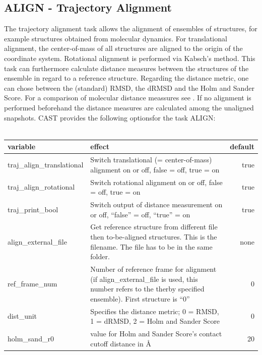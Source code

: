 \documentclass[10pt,a4paper]{article} %
\begin{document}
	\subsection{ALIGN - Trajectory Alignment}
	\label{sec:align}
	The trajectory alignment task allows the alignment of ensembles of structures, for example structures obtained from molecular dynamics. For translational alignment, the center-of-mass of all structures are aligned to the origin of the coordinate system. Rotational alignment is performed via Kabsch's method\supercite{kabsch1, kabsch2}. This task can furthermore calculate distance measures between the structures of the ensemble in regard to a reference structure. Regarding the distance metric, one can chose between the (standard) \ac{RMSD}, the \ac{dRMSD} and the Holm and Sander Score\supercite{holmsander}. For a comparison of molecular distance meassures see \cite{distancemeasures}. If no alignment is performed beforehand the distance measures are calculated among the unaligned snapshots. \ac{CAST} provides the following optionsfor the task ALIGN: \\~\\
	
	\begin{tabularx}{\textwidth}{l|X|r}
		variable & effect & default\\
		\hline
		traj\_align\_translational & Switch translational (= center-of-mass) alignment on or off, false = off, true = on & true\\
		traj\_align\_rotational & Switch rotational alignment\cite{kabsch1, kabsch2} on or off, false = off, true = on & true\\
		traj\_print\_bool & Switch output of distance measurement on or off, ``false'' = off, ``true'' = on & true\\
		align\_external\_file & Get reference structure from different file then to-be-aligned structures. This is the filename. The file has to be in the same folder. & none\\
		ref\_frame\_num & Number of reference frame for alignment (if align\_external\_file is used, this number refers to the therby specified ensemble). First structure is ``0'' & 0\\
		dist\_unit & Specifies the distance metric; 0 = RMSD, 1 = dRMSD, 2 = Holm and Sander Score & 0\\
		holm\_sand\_r0 & value for Holm and Sander Score's contact cutoff distance in \AA & 20 \\
		
	\end{tabularx}
	
\end{document}
